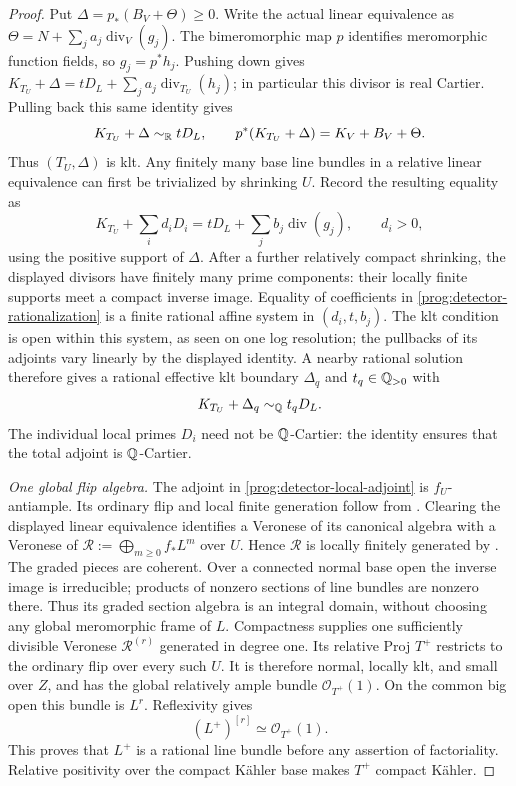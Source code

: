 \begin{proof}
Put $\Delta=p_*(B_V+\Theta)\geq0$. Write the actual linear equivalence
as $\Theta=N+\sum_j a_j\operatorname{div}_V(g_j)$.
The bimeromorphic map $p$ identifies meromorphic function fields, so
$g_j=p^*h_j$. Pushing down gives
$K_{T_U}+\Delta=tD_L+\sum_j a_j\operatorname{div}_{T_U}(h_j)$;
in particular this divisor is real Cartier. Pulling back this same
identity gives
\[
 K_{T_U}+\Delta\sim_{\mathbb R}tD_L,
 \qquad p^*(K_{T_U}+\Delta)=K_V+B_V+\Theta.
\]
Thus $(T_U,\Delta)$ is klt. Any finitely many base line bundles in a
relative linear equivalence can first be trivialized by shrinking $U$.
Record the resulting equality as
\begin{equation}\label{prog:detector-rationalization}
 K_{T_U}+\sum_i d_iD_i=tD_L+\sum_j b_j\operatorname{div}(g_j),
 \qquad d_i>0,
\end{equation}
using the positive support of $\Delta$. After a further relatively
compact shrinking, the displayed divisors have finitely many prime
components: their locally finite supports meet a compact inverse image.
Equality of coefficients in \eqref{prog:detector-rationalization} is a
finite rational affine system in $(d_i,t,b_j)$. The klt condition is
open within this system, as seen on one log resolution; the pullbacks
of its adjoints vary linearly by the displayed identity. A nearby
rational solution therefore gives a rational effective klt boundary
$\Delta_q$ and $t_q\in\mathbb Q_{>0}$ with
\begin{equation}\label{prog:detector-local-adjoint}
 K_{T_U}+\Delta_q\sim_{\mathbb Q}t_qD_L.
\end{equation}
The individual local primes $D_i$ need not be $\mathbb Q$-Cartier: the identity
ensures that the total adjoint is $\mathbb Q$-Cartier.

\smallskip\noindent
\emph{One global flip algebra.}
The adjoint in \eqref{prog:detector-local-adjoint} is $f_U$-antiample.
Its ordinary flip and local finite generation follow from
\cite[Theorems~1.14 and~1.18]{FujinoAnalyticBCHM}. Clearing the displayed
linear equivalence identifies a Veronese of its canonical algebra
with a Veronese of $\mathcal R:=\bigoplus_{m\geq0}f_*L^m$ over $U$.
Hence $\mathcal R$ is locally finitely generated by
\cite[Lemma~2.26]{FujinoAnalyticBCHM}. The graded pieces are coherent. Over a connected normal base open
the inverse image is irreducible; products of nonzero sections of line
bundles are nonzero there. Thus its graded section algebra is an
integral domain, without choosing any global meromorphic frame of $L$.
Compactness supplies one sufficiently divisible Veronese
$\mathcal R^{(r)}$ generated in degree one. Its relative Proj $T^+$
restricts to the ordinary flip over every such $U$. It is therefore
normal, locally klt, and small over $Z$, and has the global relatively
ample bundle
$\mathcal O_{T^+}(1)$. On the common big open this bundle is $L^r$.
Reflexivity gives
\[
 (L^+)^{[r]}\simeq\mathcal O_{T^+}(1).
\]
This proves that $L^+$ is a rational line bundle before any assertion
of factoriality. Relative positivity over the compact K\"ahler base
makes $T^+$ compact K\"ahler.


\end{proof}
